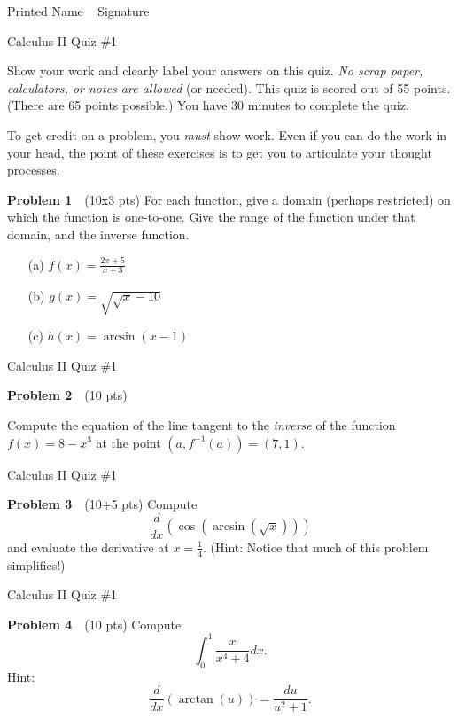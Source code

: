 \documentclass[10pt]{article}
\newcommand{\prob}[1]{\vspace{10mm} \noindent \textbf{Problem #1} \,\,}
\newcommand{\header}{
\begin{center}
Calculus II Quiz \#1
\end{center}

\vspace{2mm}

}
\newcommand{\namefield}{
\noindent Printed Name \underline{\hspace{50mm}} \,\,\, Signature \underline{\hspace{50mm}}
}
\newcommand{\inst}[2]{
Show your work and clearly label your answers on this quiz. \emph{No scrap paper, calculators, or notes are allowed} (or needed). This quiz is scored out of #1 points. (There are #2 points possible.) You have 30 minutes to complete the quiz.

To get credit on a problem, you \emph{must} show work. Even if you can do the work in your head, the point of these exercises is to get you to articulate your thought processes.
}
\begin{document}


\namefield

\header

\inst{55}{65}


\prob{1} (10x3 pts) %
For each function, give a domain (perhaps restricted) on which the function is one-to-one. Give the range of the function under that domain, and the inverse function.
\begin{itemize}
\item[(a) ] $f(x) = \frac{2x + 5}{x + 3}$
\item[(b) ] $g(x) = \sqrt{ \sqrt{x} - 10}$
\item[(c) ] $h(x) = \arcsin(x - 1)$
\end{itemize}

\pagebreak

\header

\prob{2} (10 pts) %

Compute the equation of the line tangent to the \emph{inverse} of the function $f(x) = 8 - x^3$ at the point $(a, f^{-1}(a)) = (7,1)$. 

\pagebreak

\header

\prob{3} (10+5 pts) %
Compute \[ \frac{d}{dx} \left( \cos( \arcsin(\sqrt{x}) ) \right) \] and evaluate the derivative at $x = \frac{1}{4}$.
(Hint: Notice that much of this problem simplifies!)

\pagebreak

\header

\prob{4} (10 pts) %
Compute \[ \int_0^1 \frac{x}{x^4 + 4} dx. \]
Hint: 
\[ \frac{d}{dx} \left(\arctan \left(u \right) \right) = \frac{du}{u^2 + 1}. \]
\end{document}

